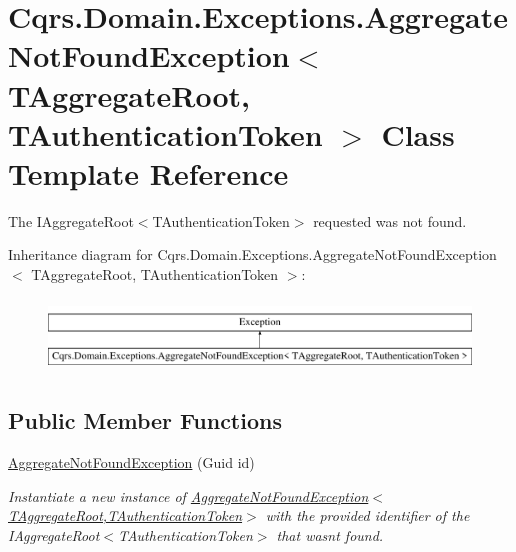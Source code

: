 \hypertarget{classCqrs_1_1Domain_1_1Exceptions_1_1AggregateNotFoundException}{}\section{Cqrs.\+Domain.\+Exceptions.\+Aggregate\+Not\+Found\+Exception$<$ T\+Aggregate\+Root, T\+Authentication\+Token $>$ Class Template Reference}
\label{classCqrs_1_1Domain_1_1Exceptions_1_1AggregateNotFoundException}


The I\+Aggregate\+Root$<$\+T\+Authentication\+Token$>$ requested was not found.  


Inheritance diagram for Cqrs.\+Domain.\+Exceptions.\+Aggregate\+Not\+Found\+Exception$<$ T\+Aggregate\+Root, T\+Authentication\+Token $>$\+:\begin{figure}[H]
\begin{center}
\leavevmode
\includegraphics[height=1.947826cm]{classCqrs_1_1Domain_1_1Exceptions_1_1AggregateNotFoundException}
\end{center}
\end{figure}
\subsection*{Public Member Functions}
\begin{DoxyCompactItemize}
\item 
\hyperlink{classCqrs_1_1Domain_1_1Exceptions_1_1AggregateNotFoundException_a44057befbb31c652727d04c5b34211ee_a44057befbb31c652727d04c5b34211ee}{Aggregate\+Not\+Found\+Exception} (Guid id)
\begin{DoxyCompactList}\small\item\em Instantiate a new instance of \hyperlink{classCqrs_1_1Domain_1_1Exceptions_1_1AggregateNotFoundException_a44057befbb31c652727d04c5b34211ee_a44057befbb31c652727d04c5b34211ee}{Aggregate\+Not\+Found\+Exception$<$\+T\+Aggregate\+Root,\+T\+Authentication\+Token$>$} with the provided identifier of the I\+Aggregate\+Root$<$\+T\+Authentication\+Token$>$ that wasn\textquotesingle{}t found. \end{DoxyCompactList}\end{DoxyCompactItemize}
